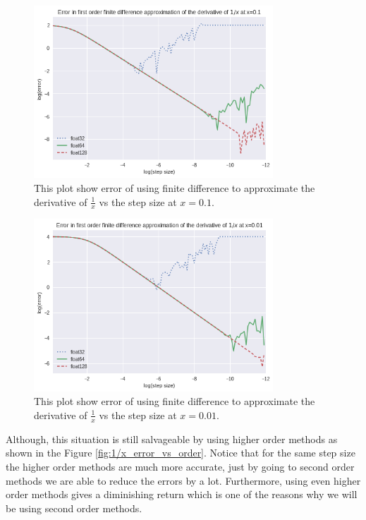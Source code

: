 \begin{figure}[hbt!]
    \centering
    \includegraphics[width=0.8\textwidth]{images/1_x_error_at_p1.png}
    \caption{This plot show error of using finite difference to approximate the derivative of $\frac{1}{x}$ vs the step size at $x = 0.1$.}
    \label{fig:1/x_0.1}
\end{figure}


\begin{figure}[hbt!]
    \centering
    \includegraphics[width=0.8\textwidth]{images/1_x_error_at_p01.png}
    \caption{This plot show error of using finite difference to approximate the derivative of $\frac{1}{x}$ vs the step size at $x = 0.01$.}
    \label{fig:1/x_0.01}
\end{figure}


Although, this situation is still salvageable by using higher order methods as shown in the Figure \ref{fig:1/x_error_vs_order}. Notice that for the same step size the higher order methods are much more accurate, just by going to second order methods we are able to reduce the errors by a lot. Furthermore, using even higher order methods gives a diminishing return which is one of the reasons why we will be using second order methods.

